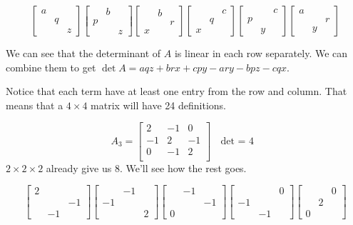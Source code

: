 \[
\begin{bmatrix}
a & & \\
& q & \\
& & z
\end{bmatrix}
%
\begin{bmatrix}
& b & \\
p & & \\
& & z
\end{bmatrix}
%
\begin{bmatrix}
& b & \\
& & r \\
x & &
\end{bmatrix}
%
\begin{bmatrix}
& & c \\
& q & \\
x & &
\end{bmatrix}
%
\begin{bmatrix}
& & c \\
p & & \\
& y &
\end{bmatrix}
%
\begin{bmatrix}
a & & \\
& & r \\
& y &
\end{bmatrix}
\]

We can see that the determinant of \(A\) is linear in each row separately. We can combine them to get \(\det A = aqz + brx + cpy - ary - bpz- cqx\). 

Notice that each term have at least one entry from the row and column. That means that a \(4 \times 4\) matrix will have 24 definitions. 

\[
    A_3 = 
    \begin{bmatrix}
        2 & -1 & 0  \\
        -1 & 2 & -1  \\
        0 & -1 & 2  \\
    \end{bmatrix}
    \text{ \(\det\) = 4 }
\]
\(2 \times 2 \times 2\) already give us \(8\). We'll see how the rest goes. 

\[
\begin{bmatrix}
2 &   &    \\
  &   & -1 \\
  & -1 &
\end{bmatrix}
%
\begin{bmatrix}
  & -1 &   \\
-1 &    &   \\
  &    & 2
\end{bmatrix}
%
\begin{bmatrix}
  & -1 &    \\
  &    & -1 \\
0 &    &
\end{bmatrix}
%
\begin{bmatrix}
  &    & 0  \\
-1 &    &    \\
  & -1 &
\end{bmatrix}
%
\begin{bmatrix}
  &   & 0 \\
  & 2 &   \\
0 &   &
\end{bmatrix}
\]

